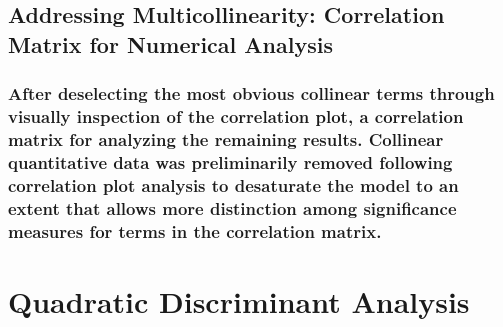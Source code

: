\documentclass[american,]{article}
\begin{document}
\hypertarget{addressing-multicollinearity-correlation-matrix-for-numerical-analysis}{%
\subsection{\texorpdfstring{\textbf{Addressing Multicollinearity: Correlation Matrix for Numerical Analysis}}{Addressing Multicollinearity: Correlation Matrix for Numerical Analysis}}\label{addressing-multicollinearity-correlation-matrix-for-numerical-analysis}}

\hypertarget{after-deselecting-the-most-obvious-collinear-terms-through-visually-inspection-of-the-correlation-plot-a-correlation-matrix-for-analyzing-the-remaining-results.-collinear-quantitative-data-was-preliminarily-removed-following-correlation-plot-analysis-to-desaturate-the-model-to-an-extent-that-allows-more-distinction-among-significance-measures-for-terms-in-the-correlation-matrix.}{%
\subsubsection{After deselecting the most obvious collinear terms through visually inspection of the correlation plot, a correlation matrix for analyzing the remaining results. Collinear quantitative data was preliminarily removed following correlation plot analysis to desaturate the model to an extent that allows more distinction among significance measures for terms in the correlation matrix.}\label{after-deselecting-the-most-obvious-collinear-terms-through-visually-inspection-of-the-correlation-plot-a-correlation-matrix-for-analyzing-the-remaining-results.-collinear-quantitative-data-was-preliminarily-removed-following-correlation-plot-analysis-to-desaturate-the-model-to-an-extent-that-allows-more-distinction-among-significance-measures-for-terms-in-the-correlation-matrix.}}

\hypertarget{quadratic-discriminant-analysis}{%
\section{\texorpdfstring{\textbf{Quadratic Discriminant Analysis}}{Quadratic Discriminant Analysis}}\label{quadratic-discriminant-analysis}}
\end{document}
